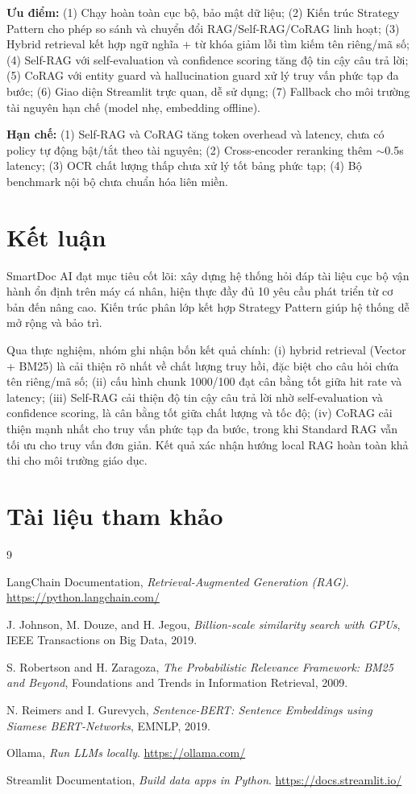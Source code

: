 \documentclass[10pt, conference, a4paper, compsocconf]{IEEEtran}
\begin{document}
\textbf{Ưu điểm:} (1) Chạy hoàn toàn cục bộ, bảo mật dữ liệu; (2) Kiến trúc Strategy Pattern cho phép so sánh và chuyển đổi RAG/Self-RAG/CoRAG linh hoạt; (3) Hybrid retrieval kết hợp ngữ nghĩa + từ khóa giảm lỗi tìm kiếm tên riêng/mã số; (4) Self-RAG với self-evaluation và confidence scoring tăng độ tin cậy câu trả lời; (5) CoRAG với entity guard và hallucination guard xử lý truy vấn phức tạp đa bước; (6) Giao diện Streamlit trực quan, dễ sử dụng; (7) Fallback cho môi trường tài nguyên hạn chế (model nhẹ, embedding offline).

\textbf{Hạn chế:} (1) Self-RAG và CoRAG tăng token overhead và latency, chưa có policy tự động bật/tắt theo tài nguyên; (2) Cross-encoder reranking thêm $\sim$0.5s latency; (3) OCR chất lượng thấp chưa xử lý tốt bảng phức tạp; (4) Bộ benchmark nội bộ chưa chuẩn hóa liên miền.

\section{Kết luận}

SmartDoc AI đạt mục tiêu cốt lõi: xây dựng hệ thống hỏi đáp tài liệu cục bộ vận hành ổn định trên máy cá nhân, hiện thực đầy đủ 10 yêu cầu phát triển từ cơ bản đến nâng cao. Kiến trúc phân lớp kết hợp Strategy Pattern giúp hệ thống dễ mở rộng và bảo trì.

Qua thực nghiệm, nhóm ghi nhận bốn kết quả chính: (i) hybrid retrieval (Vector + BM25) là cải thiện rõ nhất về chất lượng truy hồi, đặc biệt cho câu hỏi chứa tên riêng/mã số; (ii) cấu hình chunk 1000/100 đạt cân bằng tốt giữa hit rate và latency; (iii) Self-RAG cải thiện độ tin cậy câu trả lời nhờ self-evaluation và confidence scoring, là cân bằng tốt giữa chất lượng và tốc độ; (iv) CoRAG cải thiện mạnh nhất cho truy vấn phức tạp đa bước, trong khi Standard RAG vẫn tối ưu cho truy vấn đơn giản. Kết quả xác nhận hướng local RAG hoàn toàn khả thi cho môi trường giáo dục.

\section{Tài liệu tham khảo}
\begin{thebibliography}{9}

LangChain Documentation, \emph{Retrieval-Augmented Generation (RAG)}. \url{https://python.langchain.com/}

J. Johnson, M. Douze, and H. Jegou, \emph{Billion-scale similarity search with GPUs}, IEEE Transactions on Big Data, 2019.

S. Robertson and H. Zaragoza, \emph{The Probabilistic Relevance Framework: BM25 and Beyond}, Foundations and Trends in Information Retrieval, 2009.

N. Reimers and I. Gurevych, \emph{Sentence-BERT: Sentence Embeddings using Siamese BERT-Networks}, EMNLP, 2019.

Ollama, \emph{Run LLMs locally}. \url{https://ollama.com/}

Streamlit Documentation, \emph{Build data apps in Python}. \url{https://docs.streamlit.io/}

\end{thebibliography}
\end{document}

